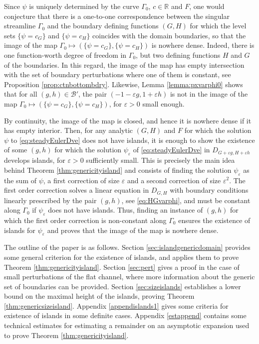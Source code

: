 \documentclass[11pt,reqno]{amsproc}
\newcommand{\R}{\mathbb{R}}
\newcommand{\ve}{\varepsilon}
\numberwithin{equation}{section}
\numberwithin{theorem}{section}
\numberwithin{prop}{section}
\numberwithin{cor}{section}
\numberwithin{lemma}{section}
\theoremstyle{remark}
\theoremstyle{definition}
\begin{document}
Since $\psi$ is uniquely determined by the curve $\Gamma_0$, $c\in \R$ and $F$, one would conjecture that there is a one-to-one correspondence between the singular streamline $\Gamma_0$ and the boundary defining functions $(G,H)$ for which the level sets $\lbrace\psi = c_G \rbrace$ and $\lbrace\psi = c_H \rbrace$ coincides with the domain boundaries, so that the image of the map $\Gamma_0\mapsto (\lbrace\psi = c_G \rbrace,\lbrace\psi = c_H \rbrace)$ is nowhere dense. Indeed, there is one function-worth degree of freedom in $\Gamma_0$, but two defining functions $H$ and $G$ of the boundaries. In this regard,  the image of the map has empty intersection with the set of boundary perturbations where one of them is constant, see Proposition \ref{prop:ctnbottombdry}. 
Likewise, Lemma \ref{lemma:pxvarphi0} shows that for all $(g,h)\in \mathcal{B}'$, the pair $(-1-\ve g,1+\ve h)$ is not in the image of the map $\Gamma_0\mapsto (\lbrace\psi = c_G \rbrace,\lbrace\psi = c_H \rbrace)$, for $\ve>0$ small enough. 

By continuity, the image of the map is closed, and hence it is nowhere dense if it has empty interior. Then, for any analytic $(G,H)$ and $F$ for which the solution $\psi$ to \eqref{eq:steadyEulerDve} does not have islands, it is enough to show the existence of some $(g,h)$ for which the solution $\psi_\ve$ of \eqref{eq:steadyEulerDve} in $D_{G+\ve g, H+\ve h}$ develops islands, for $\ve>0$ sufficiently small. This is precisely the main idea behind Theorem \ref{thm:genericityisland} and consists of finding the solution $\psi_\ve$ as the sum of $\psi$, a first correction of size $\ve$ and a second correction of size $\ve^2$. The first order correction solves a linear equation in $D_{G,H}$ with boundary conditions linearly prescribed by the pair $(g,h)$, see \eqref{eq:HGvarphi}, and must be constant along $\Gamma_0$ if $\psi_\ve$ does not have islands. Thus, finding an instance of $(g,h)$ for which the first order correction is non-constant along $\Gamma_0$ ensures the existence of islands for $\psi_\ve$ and proves that the image of the map is nowhere dense. 


The outline of the paper is as follows. Section \ref{sec:islandgenericdomain} provides some general criterion for the existence of islands, and applies them to prove Theorem \ref{thm:genericityisland}.  Section \ref{sec:pert} gives a proof in the case of small perturbations of the flat channel, where more information about the generic set of boundaries can be provided.  Section \ref{sec:sizeislands} establishes a lower bound on the maximal height of the islands, proving Theorem \ref{thm:genericsizeisland}.  Appendix \ref{appendislands1} gives some criteria for existence of islands in some definite cases.  Appendix \ref{estappend} contains some technical estimates for estimating a remainder on an asymptotic expansion used to prove Theorem \ref{thm:genericityisland}.
\end{document}
